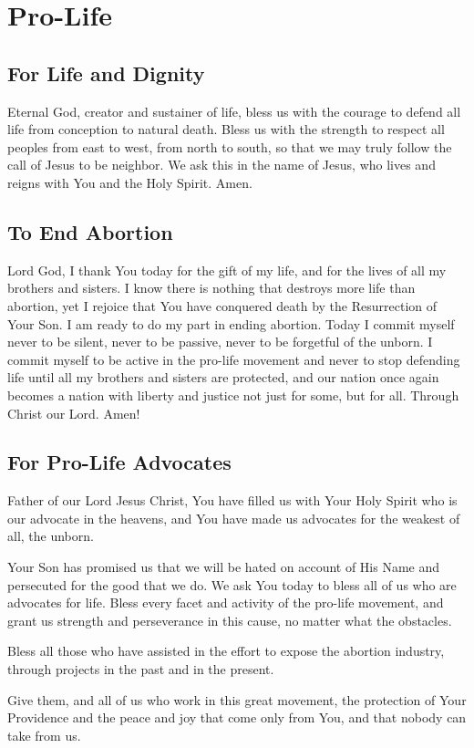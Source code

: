 \documentclass[12pt]{article}
\newcommand{\prayersection}[1]{\section{#1}}
\newcommand{\prayertitle}[1]{\subsection{#1}}
\begin{document}
\newpage

\prayersection{Pro-Life}
\prayertitle{For Life and Dignity}
Eternal God, creator and sustainer of life, bless us with the courage to defend all life from conception to natural death.
Bless us with the strength to respect all peoples from east to west, from north to south,
so that we may truly follow the call of Jesus to be neighbor.
We ask this in the name of Jesus, who lives and reigns with You and the Holy Spirit.
Amen.

\prayertitle{To End Abortion}
Lord God, I thank You today for the gift of my life, and for the lives of all my brothers and sisters.
I know there is nothing that destroys more life than abortion, yet I rejoice that You have conquered death by the Resurrection of Your Son. 
I am ready to do my part in ending abortion. Today I commit myself 
never to be silent, 
never to be passive, 
never to be forgetful of the unborn. 
I commit myself to be active in the pro-life movement and never to stop defending life until all my brothers and sisters are protected, and our nation once again becomes a nation with liberty and justice not just for some, but for all.
Through Christ our Lord. Amen!

\prayertitle{For Pro-Life Advocates}
Father of our Lord Jesus Christ,
You have filled us with Your Holy Spirit who is our advocate in the heavens, and You have made us advocates for the weakest of all, the unborn.

Your Son has promised us that we will be hated on account of His Name and persecuted for the good that we do.
We ask You today to bless all of us who are advocates for life.
Bless every facet and activity of the pro-life movement, and grant us strength and perseverance in this cause, no matter what the obstacles.

Bless all those who have assisted in the effort to expose the abortion industry, through projects in the past and in the present.

Give them, and all of us who work in this great movement, the protection of Your Providence and the peace and joy that come only from You, and that nobody can take from us.
\end{document}
